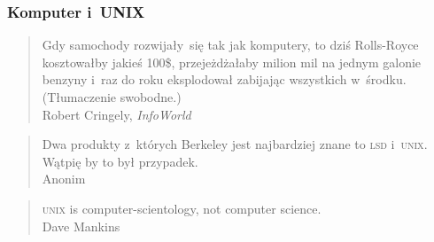 \documentclass[10pt,t]{beamer}
\begin{document}
\begin{frame}
  \frametitle{Komputer i~UNIX}


  \begin{quote}

    Gdy samochody rozwijały~się tak jak komputery, to dziś Rolls-Royce
    kosztowałby jakieś 100\$, przejeżdżałaby milion mil na jednym galonie
    benzyny i~raz do roku eksplodował zabijając wszystkich w~środku.
    (Tłumaczenie swobodne.) \\
    Robert Cringely, \textit{InfoWorld}

  \end{quote}

  \vspace{2em}





  \begin{quote}

    Dwa produkty z~których Berkeley jest najbardziej znane to \textsc{lsd}
    i~\textsc{unix}. Wątpię by to był przypadek. \\
    Anonim

  \end{quote}

  \vspace{2em}





  \begin{quote}

    \textsc{unix} is computer-scientology, not computer science. \\
    Dave Mankins

  \end{quote}









\end{frame}
\end{document}
